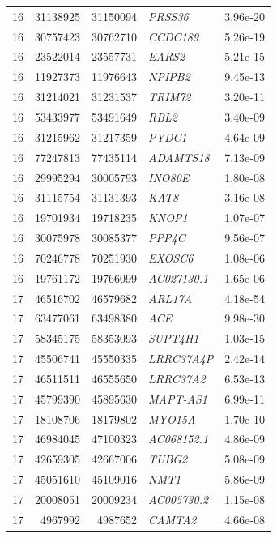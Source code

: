 \begin{longtable}{rrrlr}
   16 & 31138925 & 31150094 & \textit{PRSS36} & 3.96e-20 \\ 
   16 & 30757423 & 30762710 & \textit{CCDC189} & 5.26e-19 \\ 
   16 & 23522014 & 23557731 & \textit{EARS2} & 5.21e-15 \\ 
   16 & 11927373 & 11976643 & \textit{NPIPB2} & 9.45e-13 \\ 
   16 & 31214021 & 31231537 & \textit{TRIM72} & 3.20e-11 \\ 
   16 & 53433977 & 53491649 & \textit{RBL2} & 3.40e-09 \\ 
   16 & 31215962 & 31217359 & \textit{PYDC1} & 4.64e-09 \\ 
   16 & 77247813 & 77435114 & \textit{ADAMTS18} & 7.13e-09 \\ 
   16 & 29995294 & 30005793 & \textit{INO80E} & 1.80e-08 \\ 
   16 & 31115754 & 31131393 & \textit{KAT8} & 3.16e-08 \\ 
   16 & 19701934 & 19718235 & \textit{KNOP1} & 1.07e-07 \\ 
   16 & 30075978 & 30085377 & \textit{PPP4C} & 9.56e-07 \\ 
   16 & 70246778 & 70251930 & \textit{EXOSC6} & 1.08e-06 \\ 
   16 & 19761172 & 19766099 & \textit{AC027130.1} & 1.65e-06 \\ 
   17 & 46516702 & 46579682 & \textit{ARL17A} & 4.18e-54 \\ 
   17 & 63477061 & 63498380 & \textit{ACE} & 9.98e-30 \\ 
   17 & 58345175 & 58353093 & \textit{SUPT4H1} & 1.03e-15 \\ 
   17 & 45506741 & 45550335 & \textit{LRRC37A4P} & 2.42e-14 \\ 
   17 & 46511511 & 46555650 & \textit{LRRC37A2} & 6.53e-13 \\ 
   17 & 45799390 & 45895630 & \textit{MAPT-AS1} & 6.99e-11 \\ 
   17 & 18108706 & 18179802 & \textit{MYO15A} & 1.70e-10 \\ 
   17 & 46984045 & 47100323 & \textit{AC068152.1} & 4.86e-09 \\ 
   17 & 42659305 & 42667006 & \textit{TUBG2} & 5.08e-09 \\ 
   17 & 45051610 & 45109016 & \textit{NMT1} & 5.86e-09 \\ 
   17 & 20008051 & 20009234 & \textit{AC005730.2} & 1.15e-08 \\ 
   17 & 4967992 & 4987652 & \textit{CAMTA2} & 4.66e-08 \\ 

\end{longtable}
